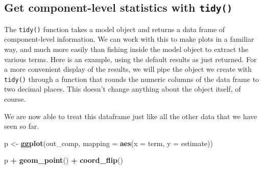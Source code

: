 \documentclass[]{book}
\newenvironment{Shaded}{\begin{snugshade}}{\end{snugshade}}
\newcommand{\CommentTok}[1]{\textcolor[rgb]{0.56,0.35,0.01}{\textit{#1}}}
\newcommand{\DataTypeTok}[1]{\textcolor[rgb]{0.13,0.29,0.53}{#1}}
\newcommand{\KeywordTok}[1]{\textcolor[rgb]{0.13,0.29,0.53}{\textbf{#1}}}
\newcommand{\NormalTok}[1]{#1}
\newcommand{\OperatorTok}[1]{\textcolor[rgb]{0.81,0.36,0.00}{\textbf{#1}}}
\newcommand{\StringTok}[1]{\textcolor[rgb]{0.31,0.60,0.02}{#1}}
\begin{document}
\hypertarget{get-component-level-statistics-with-tidy}{%
\subsection{\texorpdfstring{Get component-level statistics with \texttt{tidy()}}{Get component-level statistics with tidy()}}\label{get-component-level-statistics-with-tidy}}

The \texttt{tidy()} function takes a model object and returns a data frame of component-level information. We can work with this to make plots in a familiar way, and much more easily than fishing inside the model object to extract the various terms. Here is an example, using the default results as just returned. For a more convenient display of the results, we will pipe the object we create with \texttt{tidy()} through a function that rounds the numeric columns of the data frame to two decimal places. This doesn't change anything about the object itself, of course.\\

\begin{Shaded}
\end{Shaded}

We are now able to treat this dataframe just like all the other data that we have seen so far.\\

\begin{Shaded}
\begin{Highlighting}[]
\NormalTok{p <-}\StringTok{ }\KeywordTok{ggplot}\NormalTok{(out_comp, }\DataTypeTok{mapping =} \KeywordTok{aes}\NormalTok{(}\DataTypeTok{x =}\NormalTok{ term,}
                                    \DataTypeTok{y =}\NormalTok{ estimate))}

\NormalTok{p }\OperatorTok{+}\StringTok{ }\KeywordTok{geom_point}\NormalTok{() }\OperatorTok{+}\StringTok{ }\KeywordTok{coord_flip}\NormalTok{() }
\end{Highlighting}
\end{Shaded}
\end{document}
